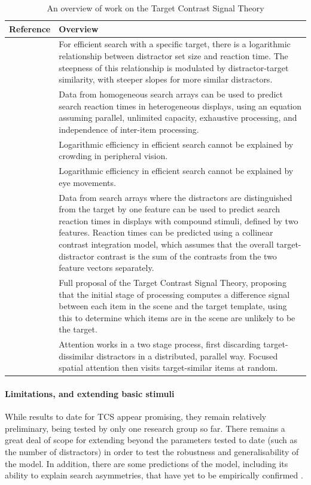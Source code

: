 \documentclass[smallextended, natbib]{svjour3}       %
\begin{document}
\begin{table}[h]
\centering
\begin{tabularx}{\textwidth}{lX}
Reference & Overview\\
 \hline 
\cite{buetti2016towards} & For efficient search with a specific target, there is a logarithmic relationship between distractor set size and reaction time. The steepness of this relationship is modulated by distractor-target similarity, with steeper slopes for more similar distractors.\\
\cite{wang2017predicting} & Data from homogeneous search arrays can be used to predict search reaction times in heterogeneous displays, using an equation assuming parallel, unlimited capacity, exhaustive processing, and independence of inter-item processing. \\ 
\cite{madison2018role} & Logarithmic efficiency in efficient search cannot be explained by crowding in peripheral vision. \\
\cite{ng2018fixed} & Logarithmic efficiency in efficient search cannot be explained by eye movements. \\
\cite{buetti2019predicting} & Data from search arrays where the distractors are distinguished from the target by one feature can be used to predict search reaction times in displays with compound stimuli, defined by two features. Reaction times can be predicted using a collinear contrast integration model, which assumes that the overall target-distractor contrast is the sum of the contrasts from the two feature vectors separately. \\
\cite{lleras2020target} & Full proposal of the Target Contrast Signal Theory, proposing that the initial stage of processing computes a difference signal between each item in the scene and the target template, using this to determine which items are in the scene are unlikely to be the target. \\
\cite{ng2020prioritization} & Attention works in a two stage process, first discarding target-dissimilar distractors in a distributed, parallel way. Focused spatial attention then visits target-similar items at random. \\
\end{tabularx}
\caption{An overview of work on the Target Contrast Signal Theory}
\label{tab:tcs_overview}
\end{table}

\paragraph{Limitations, and extending basic stimuli} While results to date for TCS appear promising, they remain relatively preliminary, being tested by only one research group so far. There remains a great deal of scope for extending beyond the parameters tested to date (such as the number of distractors) in order to test the robustness and generalisability of the model. In addition, there are some predictions of the model, including its ability to explain search asymmetries, that have yet to be empirically confirmed \citep{lleras2020target}.
\end{document}
